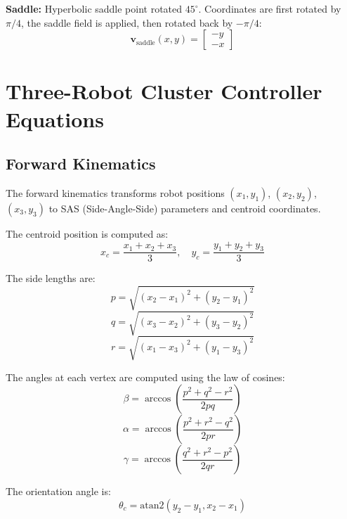 \documentclass[lettersize,journal]{IEEEtran}
\begin{document}
\textbf{Saddle:} Hyperbolic saddle point rotated $45^\circ$. Coordinates are first rotated by $\pi/4$, the saddle field is applied, then rotated back by $-\pi/4$:
\begin{equation}
\mathbf{v}_{\text{saddle}}(x, y) = \begin{bmatrix} -y \\ -x \end{bmatrix}
\end{equation}

\section{Three-Robot Cluster Controller Equations}

\subsection{Forward Kinematics}

The forward kinematics transforms robot positions $(x_1, y_1)$, $(x_2, y_2)$, $(x_3, y_3)$ to SAS (Side-Angle-Side) parameters and centroid coordinates.

The centroid position is computed as:
\begin{equation}
x_c = \frac{x_1 + x_2 + x_3}{3}, \quad y_c = \frac{y_1 + y_2 + y_3}{3}
\end{equation}

The side lengths are:
\begin{equation}
p = \sqrt{(x_2 - x_1)^2 + (y_2 - y_1)^2}
\end{equation}
\begin{equation}
q = \sqrt{(x_3 - x_2)^2 + (y_3 - y_2)^2}
\end{equation}
\begin{equation}
r = \sqrt{(x_1 - x_3)^2 + (y_1 - y_3)^2}
\end{equation}

The angles at each vertex are computed using the law of cosines:
\begin{equation}
\beta = \arccos\left(\frac{p^2 + q^2 - r^2}{2pq}\right)
\end{equation}
\begin{equation}
\alpha = \arccos\left(\frac{p^2 + r^2 - q^2}{2pr}\right)
\end{equation}
\begin{equation}
\gamma = \arccos\left(\frac{q^2 + r^2 - p^2}{2qr}\right)
\end{equation}

The orientation angle is:
\begin{equation}
\theta_c = \text{atan2}(y_2 - y_1, x_2 - x_1)
\end{equation}
\end{document}
